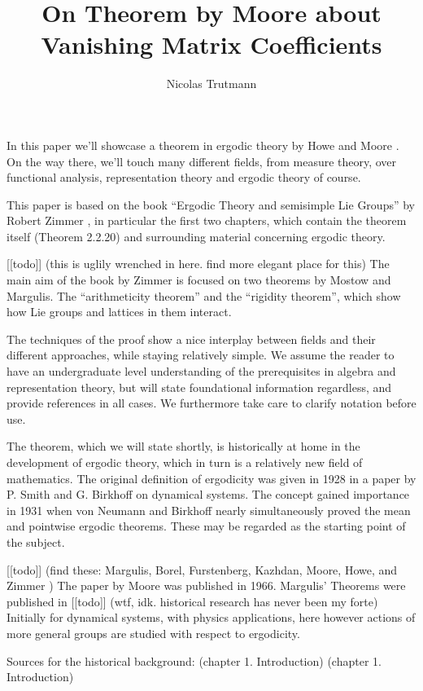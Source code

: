 \documentclass[
]{article}
\title{On Theorem by Moore about Vanishing Matrix Coefficients}
\author{Nicolas Trutmann}
\date{}
\begin{document}
\maketitle

In this paper we'll showcase a theorem in ergodic theory by Howe and
Moore \cite{howe79}. On the way there, we'll touch many different
fields, from measure theory, over functional analysis, representation
theory and ergodic theory of course.

This paper is based on the book ``Ergodic Theory and semisimple Lie
Groups'' by Robert Zimmer \cite{Zimmer84}, in particular the first two
chapters, which contain the theorem itself (Theorem 2.2.20) and
surrounding material concerning ergodic theory.

{[}{[}todo{]}{]} (this is uglily wrenched in here. find more elegant
place for this) The main aim of the book by Zimmer is focused on two
theorems by Mostow and Margulis. The ``arithmeticity theorem'' and the
``rigidity theorem'', which show how Lie groups and lattices in them
interact.

The techniques of the proof show a nice interplay between fields and
their different approaches, while staying relatively simple. We assume
the reader to have an undergraduate level understanding of the
prerequisites in algebra and representation theory, but will state
foundational information regardless, and provide references in all
cases. We furthermore take care to clarify notation before use.

The theorem, which we will state shortly, is historically at home in the
development of ergodic theory, which in turn is a relatively new field
of mathematics. The original definition of ergodicity was given in 1928
in a paper by P. Smith and G. Birkhoff on dynamical systems. The concept
gained importance in 1931 when von Neumann and Birkhoff nearly
simultaneously proved the mean and pointwise ergodic theorems. These may
be regarded as the starting point of the subject.

{[}{[}todo{]}{]} (find these: Margulis, Borel, Furstenberg, Kazhdan,
Moore, Howe, and Zimmer \cite{Mackey74}) The paper by Moore
\cite{Moore66} was published in 1966. Margulis' Theorems were published
in {[}{[}todo{]}{]} (wtf, idk. historical research has never been my
forte) Initially for dynamical systems, with physics applications, here
however actions of more general groups are studied with respect to
ergodicity.

Sources for the historical background: \cite{Mackey74}(chapter 1.
Introduction) \cite{Zimmer84}(chapter 1. Introduction)
\end{document}
